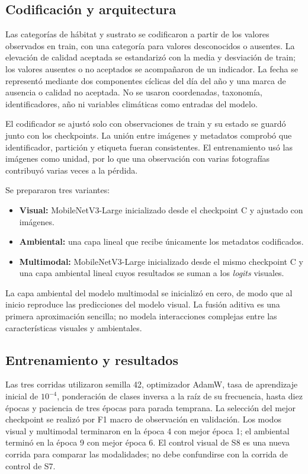 \documentclass[11pt,a4paper]{article}
\begin{document}
\subsection{Codificación y arquitectura}
Las categorías de hábitat y sustrato se codificaron a partir de los valores
observados en train, con una categoría para valores desconocidos o ausentes.
La elevación de calidad aceptada se estandarizó con la media y desviación de
train; los valores ausentes o no aceptados se acompañaron de un indicador.
La fecha se representó mediante dos componentes cíclicas del día del año y una
marca de ausencia o calidad no aceptada. No se usaron coordenadas, taxonomía,
identificadores, año ni variables climáticas como entradas del modelo.

El codificador se ajustó solo con observaciones de train y su estado se guardó
junto con los checkpoints. La unión entre imágenes y metadatos comprobó que
identificador, partición y etiqueta fueran consistentes. El entrenamiento usó
las imágenes como unidad, por lo que una observación con varias fotografías
contribuyó varias veces a la pérdida.

Se prepararon tres variantes:
\begin{itemize}
\item \textbf{Visual:} MobileNetV3-Large inicializado desde el checkpoint C y
ajustado con imágenes.
\item \textbf{Ambiental:} una capa lineal que recibe únicamente los metadatos
codificados.
\item \textbf{Multimodal:} MobileNetV3-Large inicializado desde el mismo
checkpoint C y una capa ambiental lineal cuyos resultados se suman a los
\emph{logits} visuales.
\end{itemize}

La capa ambiental del modelo multimodal se inicializó en cero, de modo que al
inicio reproduce las predicciones del modelo visual. La fusión aditiva es una
primera aproximación sencilla; no modela interacciones complejas entre las
características visuales y ambientales.

\subsection{Entrenamiento y resultados}
Las tres corridas utilizaron semilla 42, optimizador AdamW, tasa de aprendizaje
inicial de $10^{-4}$, ponderación de clases inversa a la raíz de su frecuencia,
hasta diez épocas y paciencia de tres épocas para parada temprana. La selección
del mejor checkpoint se realizó por F1 macro de observación en validación.
Los modos visual y multimodal terminaron en la época 4 con mejor época 1; el
ambiental terminó en la época 9 con mejor época 6.
El control visual de S8 es una nueva corrida para comparar las modalidades;
no debe confundirse con la corrida de control de S7.
\end{document}

